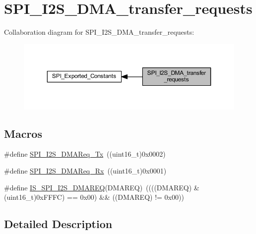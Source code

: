 \hypertarget{group___s_p_i___i2_s___d_m_a__transfer__requests}{}\section{S\+P\+I\+\_\+\+I2\+S\+\_\+\+D\+M\+A\+\_\+transfer\+\_\+requests}
\label{group___s_p_i___i2_s___d_m_a__transfer__requests}
Collaboration diagram for S\+P\+I\+\_\+\+I2\+S\+\_\+\+D\+M\+A\+\_\+transfer\+\_\+requests\+:
\nopagebreak
\begin{figure}[H]
\begin{center}
\leavevmode
\includegraphics[width=350pt]{group___s_p_i___i2_s___d_m_a__transfer__requests}
\end{center}
\end{figure}
\subsection*{Macros}
\begin{DoxyCompactItemize}
\item 
\#define \hyperlink{group___s_p_i___i2_s___d_m_a__transfer__requests_ga05f55a18c83aaa945d99200d012e5e2a}{S\+P\+I\+\_\+\+I2\+S\+\_\+\+D\+M\+A\+Req\+\_\+\+Tx}~((uint16\+\_\+t)0x0002)
\item 
\#define \hyperlink{group___s_p_i___i2_s___d_m_a__transfer__requests_gaa7f680295cdc1af9b086bf51312f15f3}{S\+P\+I\+\_\+\+I2\+S\+\_\+\+D\+M\+A\+Req\+\_\+\+Rx}~((uint16\+\_\+t)0x0001)
\item 
\#define \hyperlink{group___s_p_i___i2_s___d_m_a__transfer__requests_ga6a8f97093494f2331dbdf9295d7c2c6b}{I\+S\+\_\+\+S\+P\+I\+\_\+\+I2\+S\+\_\+\+D\+M\+A\+R\+EQ}(D\+M\+A\+R\+EQ)~((((D\+M\+A\+R\+EQ) \& (uint16\+\_\+t)0x\+F\+F\+F\+C) == 0x00) \&\& ((\+D\+M\+A\+R\+E\+Q) != 0x00))
\end{DoxyCompactItemize}


\subsection{Detailed Description}


